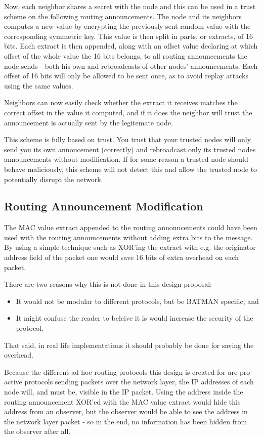 Now, each neighbor shares a secret with the node and this can be used in a trust
scheme on the following routing announcements. The node and its neighbors
computes a new value by encrypting the previously sent random value with the
corresponding symmetric key. This value is then split in parts, or extracts, of
16 bits. Each extract is then appended, along with an offset value declaring at
which offset of the whole value the 16 bits belongs, to all routing
announcements the node sends - both his own and rebroadcasts of other nodes'
announcements. Each offset of 16 bits will only be allowed to be sent once, as
to avoid replay attacks using the same values. 

Neighbors can now easily check whether the extract it receives matches the
correct offset in the value it computed, and if it does the neighbor will trust
the announcement is actually sent by the legitemate node. 

This scheme is fully based on trust. You trust that your trusted nodes will only
send you its own annoucement (correctly) and rebroadcast only its trusted nodes
announcements without modification. If for some reason a trusted node should
behave maliciously, this scheme will not detect this and allow the trusted node
to potentially disrupt the network.

\subsection{Routing Announcement Modification}
The \ac{MAC} value extract appended to the routing announcements could have been
used with the routing announcements without adding extra bits to the message. By
using a simple technique such as XOR'ing the extract with e.g. the originator
address field of the packet one would save 16 bits of extra overhead on each
packet.

There are two reasons why this is not done in this design proposal:

\begin{itemize}
  \item It would not be modular to different protocols, but be BATMAN specific,
  and
  \item It might confuse the reader to beleive it is would increase the security
  of the protocol.
\end{itemize}

That said, in real life implementations it should probably be done for saving
the overhead.

Because the different ad hoc routing protocols this design is created for are
pro-active protocols sending packets over the network layer, the IP addresses of
each node will, and must be, visible in the IP packet. Using the address inside
the routing announcement XOR'ed with the \ac{MAC} value extract would hide this
address from an observer, but the observer would be able to see the address in
the network layer packet - so in the end, no information has been hidden from
the observer after all.

